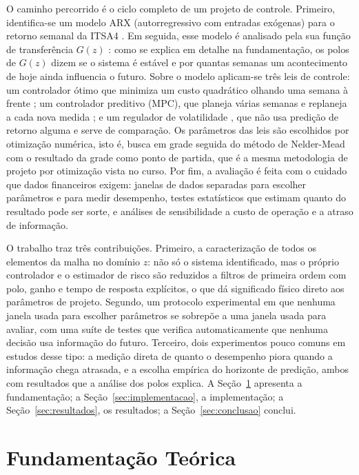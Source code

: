 \documentclass[conference]{IEEEtran}
\begin{document}
O caminho percorrido é o ciclo completo de um projeto de controle. Primeiro, identifica-se um modelo ARX (autorregressivo com entradas exógenas) para o retorno semanal da ITSA4 \cite{ljung1999}. Em seguida, esse modelo é analisado pela sua função de transferência $G(z)$ \cite{astrom1997}: como se explica em detalhe na fundamentação, os polos de $G(z)$ dizem se o sistema é estável e por quantas semanas um acontecimento de hoje ainda influencia o futuro. Sobre o modelo aplicam-se três leis de controle: um controlador ótimo que minimiza um custo quadrático olhando uma semana à frente \cite{anderson1990}; um controlador preditivo (MPC), que planeja várias semanas e replaneja a cada nova medida \cite{camacho2007,mayne2000}; e um regulador de volatilidade \cite{moreira2017}, que não usa predição de retorno alguma e serve de comparação. Os parâmetros das leis são escolhidos por otimização numérica, isto é, busca em grade seguida do método de Nelder-Mead \cite{nelder1965} com o resultado da grade como ponto de partida, que é a mesma metodologia de projeto por otimização vista no curso. Por fim, a avaliação é feita com o cuidado que dados financeiros exigem: janelas de dados separadas para escolher parâmetros e para medir desempenho, testes estatísticos que estimam quanto do resultado pode ser sorte, e análises de sensibilidade a custo de operação e a atraso de informação.

O trabalho traz três contribuições. Primeiro, a caracterização de todos os elementos da malha no domínio $z$: não só o sistema identificado, mas o próprio controlador e o estimador de risco são reduzidos a filtros de primeira ordem com polo, ganho e tempo de resposta explícitos, o que dá significado físico direto aos parâmetros de projeto. Segundo, um protocolo experimental em que nenhuma janela usada para escolher parâmetros se sobrepõe a uma janela usada para avaliar, com uma suíte de testes que verifica automaticamente que nenhuma decisão usa informação do futuro. Terceiro, dois experimentos pouco comuns em estudos desse tipo: a medição direta de quanto o desempenho piora quando a informação chega atrasada, e a escolha empírica do horizonte de predição, ambos com resultados que a análise dos polos explica. A Seção~\ref{sec:teoria} apresenta a fundamentação; a Seção~\ref{sec:implementacao}, a implementação; a Seção~\ref{sec:resultados}, os resultados; a Seção~\ref{sec:conclusao} conclui.

\section{Fundamentação Teórica}\label{sec:teoria}
\end{document}
